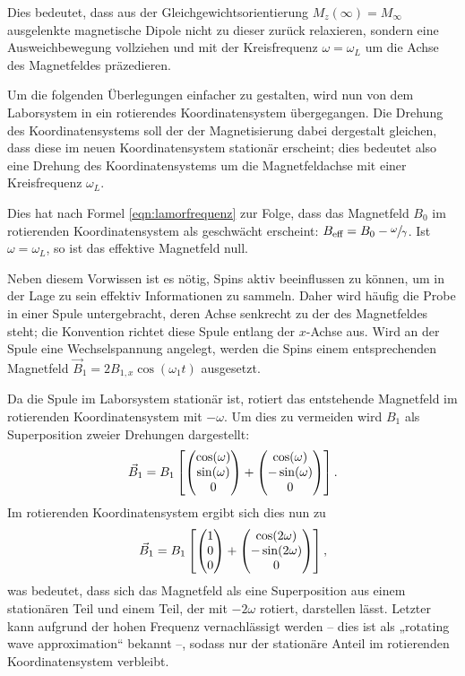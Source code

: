 Dies bedeutet, dass aus der Gleichgewichtsorientierung $M_z(\infty) = M_\infty$ ausgelenkte magnetische Dipole nicht zu dieser zurück relaxieren, sondern eine Ausweichbewegung vollziehen und mit der Kreisfrequenz $\omega = \omega_L$ um die Achse des Magnetfeldes präzedieren.

Um die folgenden Überlegungen einfacher zu gestalten, wird nun von dem Laborsystem in ein rotierendes Koordinatensystem übergegangen. Die Drehung des Koordinatensystems soll der der Magnetisierung dabei dergestalt gleichen, dass diese im neuen Koordinatensystem stationär erscheint; dies bedeutet also eine Drehung des Koordinatensystems um die Magnetfeldachse mit einer Kreisfrequenz $\omega_L$.

Dies hat nach Formel \eqref{eqn:lamorfrequenz} zur Folge, dass das Magnetfeld $B_0$ im rotierenden Koordinatensystem als geschwächt erscheint: $B_\text{eff} = B_0 - \sfrac{\omega}{\gamma}$. Ist $\omega = \omega_L$, so ist das effektive Magnetfeld null.


Neben diesem Vorwissen ist es nötig, Spins aktiv beeinflussen zu können, um in der Lage zu sein effektiv Informationen zu sammeln. Daher wird häufig die Probe in einer Spule untergebracht, deren Achse senkrecht zu der des Magnetfeldes steht; die Konvention richtet diese Spule entlang der $x$-Achse aus. Wird an der Spule eine Wechselspannung angelegt, werden die Spins einem entsprechenden Magnetfeld $\vec{B}_1 = 2 B_{1,x} \cos(\omega_1 t)$ ausgesetzt.

Da die Spule im Laborsystem stationär ist, rotiert das entstehende Magnetfeld im rotierenden Koordinatensystem mit $-\omega$. Um dies zu vermeiden wird $B_1$ als Superposition zweier Drehungen dargestellt:
\begin{align}
    \vec{B}_1 = B_1 \left[ \begin{pmatrix}\cos(\omega) \\ \sin(\omega) \\ 0\end{pmatrix} + 
                      \begin{pmatrix}\cos(\omega) \\ -\sin(\omega) \\ 0\end{pmatrix} \right].
\end{align}
Im rotierenden Koordinatensystem ergibt sich dies nun zu
\begin{align}
    \vec{B}_1 = B_1 \left[ \begin{pmatrix}1 \\ 0 \\ 0\end{pmatrix} + 
                      \begin{pmatrix}\cos(2\omega) \\ -\sin(2\omega) \\ 0\end{pmatrix} \right],
\end{align}
was bedeutet, dass sich das Magnetfeld als eine Superposition aus einem stationären Teil und einem Teil, der mit $-2\omega$ rotiert, darstellen lässt. Letzter kann aufgrund der hohen Frequenz vernachlässigt werden -- dies ist als „rotating wave approximation“ bekannt --, sodass nur der stationäre Anteil im rotierenden Koordinatensystem verbleibt.

